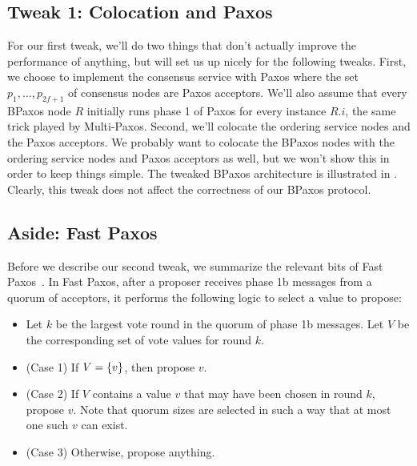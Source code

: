 \documentclass{mwhittaker}
\begin{document}
\subsection{Tweak 1: Colocation and Paxos}
For our first tweak, we'll do two things that don't actually improve the
performance of anything, but will set us up nicely for the following tweaks.
First, we choose to implement the consensus service with Paxos where the set
$p_1, \ldots, p_{2f+1}$ of consensus nodes are Paxos acceptors. We'll also
assume that every BPaxos node $R$ initially runs phase 1 of Paxos for every
instance $R.i$, the same trick played by Multi-Paxos. Second, we'll colocate
the ordering service nodes and the Paxos acceptors. We probably want to
colocate the BPaxos nodes with the ordering service nodes and Paxos acceptors
as well, but we won't show this in order to keep things simple.
%
The tweaked BPaxos architecture is illustrated in .
Clearly, this tweak does not affect the correctness of our BPaxos protocol.

{}

\subsection{Aside: Fast Paxos}
Before we describe our second tweak, we summarize the relevant bits of Fast
Paxos~\cite{lamport2006fast}. In Fast Paxos, after a proposer receives phase 1b
messages from a quorum of acceptors, it performs the following logic to select
a value to propose:
\begin{itemize}
  \item
    Let $k$ be the largest vote round in the quorum of phase 1b messages.
    Let $V$ be the corresponding set of vote values for round $k$.
  \item
    (Case 1) If $V = \{v\}$, then propose $v$.
  \item
    (Case 2) If $V$ contains a value $v$ that may have been chosen in round
    $k$, propose $v$. Note that quorum sizes are selected in such a way that at
    most one such $v$ can exist.
  \item
    (Case 3) Otherwise, propose anything.
\end{itemize}
\end{document}
